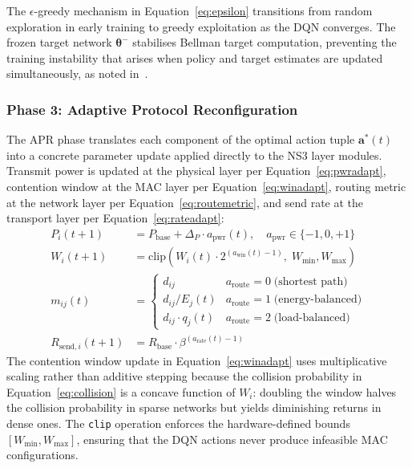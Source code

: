 \documentclass[a4paper]{cas-dc}
\numberwithin{equation}{section}
\begin{document}
The $\epsilon$-greedy mechanism in Equation~\ref{eq:epsilon} transitions from random exploration in early training to greedy exploitation as the DQN converges. The frozen target network $\boldsymbol{\theta}^-$ stabilises Bellman target computation, preventing the training instability that arises when policy and target estimates are updated simultaneously, as noted in~\cite{Zhang202214629,Serra2025}.

\subsubsection{Phase 3: Adaptive Protocol Reconfiguration}
\label{subsubsec:phase3}

The APR phase translates each component of the optimal action tuple $\mathbf{a}^*(t)$ into a concrete parameter update applied directly to the NS3 layer modules. Transmit power is updated at the physical layer per Equation~\ref{eq:pwradapt}, contention window at the MAC layer per Equation~\ref{eq:winadapt}, routing metric at the network layer per Equation~\ref{eq:routemetric}, and send rate at the transport layer per Equation~\ref{eq:rateadapt}:
\begin{align}
\label{eq:pwradapt}
P_i(t{+}1)            &= P_{\text{base}} + \Delta_P\cdot a_{\text{pwr}}(t), \quad a_{\text{pwr}}\in\{-1,0,+1\} \\[4pt]
\label{eq:winadapt}
W_i(t{+}1)            &= \mathrm{clip}\!\left(W_i(t)\cdot 2^{(a_{\text{win}}(t)-1)},\;W_{\min},W_{\max}\right) \\[4pt]
\label{eq:routemetric}
m_{ij}(t)             &= \begin{cases}
  d_{ij}             & a_{\text{route}}=0 \;\text{(shortest path)} \\
  d_{ij}/E_j(t)      & a_{\text{route}}=1 \;\text{(energy-balanced)} \\
  d_{ij}\cdot q_j(t) & a_{\text{route}}=2 \;\text{(load-balanced)}
\end{cases} \\[4pt]
\label{eq:rateadapt}
R_{\text{send},i}(t{+}1) &= R_{\text{base}}\cdot\beta^{(a_{\text{rate}}(t)-1)}
\end{align}
The contention window update in Equation~\ref{eq:winadapt} uses multiplicative scaling rather than additive stepping because the collision probability in Equation~\ref{eq:collision} is a concave function of $W_i$: doubling the window halves the collision probability in sparse networks but yields diminishing returns in dense ones. The \texttt{clip} operation enforces the hardware-defined bounds $[W_{\min}, W_{\max}]$, ensuring that the DQN actions never produce infeasible MAC configurations.
\end{document}

